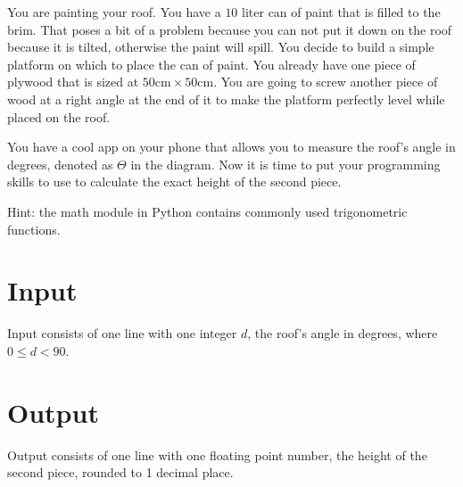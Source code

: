 

You are painting your roof.
You have a $10$ liter can of paint that is filled to the brim.
That poses a bit of a problem because you can not put it down on the roof because it is tilted, otherwise the paint will spill.
You decide to build a simple platform on which to place the can of paint.
You already have one piece of plywood that is sized at $50 \mathrm{cm} \times 50 \mathrm{cm}$.
You are going to screw another piece of wood at a right angle at the end of it to make the platform perfectly level while placed on the roof.


You have a cool app on your phone that allows you to measure the roof's angle in degrees, denoted as $\Theta$ in the diagram.
Now it is time to put your programming skills to use to calculate the exact height of the second piece.

Hint: the math module in Python contains commonly used trigonometric functions.



\section*{Input}
Input consists of one line with one integer $d$, the roof's angle in degrees, where $0 \leq d < 90$.

\section*{Output}
Output consists of one line with one floating point number, the height of the second piece, rounded to 1 decimal place.




